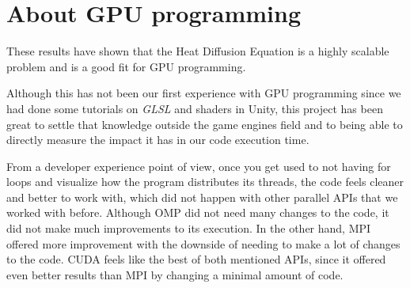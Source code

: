 \documentclass[../main.tex]{subfiles}
\begin{document}
\section{About GPU programming}

These results have shown that the Heat Diffusion Equation is a highly scalable problem and is a good fit for GPU programming.

Although this has not been our first experience with GPU programming  since we had done some tutorials on \textit{GLSL} and shaders in Unity, this project has been great to settle that knowledge outside the game engines field and to being able to directly measure the impact it has in our code execution time.

From a developer experience point of view, once you get used to not having for loops and visualize how the program distributes its threads, the code feels cleaner and better to work with, which did not happen with other parallel APIs that we worked with before.
Although OMP did not need many changes to the code, it did not make much improvements to its execution. In the other hand, MPI offered more improvement with the downside of needing to make a lot of changes to the code. CUDA feels like the best of both mentioned APIs, since it offered even better results than MPI by changing a minimal amount of code.
\end{document}
